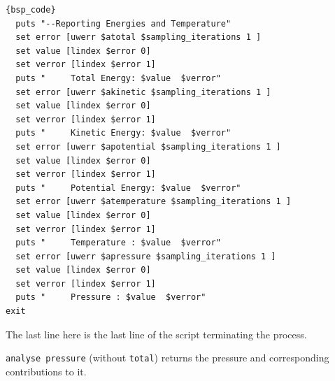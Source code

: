 \documentclass[
paper=a4,                       %
fontsize=11pt,                  %
twoside,                        %
footsepline,                    %
headsepline,                    %
headinclude=false,              %
footinclude=false,              %
pagesize,                       %
]{scrartcl}
\newtheorem{task}{Task}
\begin{document}
{\small\vspace{0,2cm}
\begin{lstlisting}[firstnumber=auto]{bsp_code}
  puts "--Reporting Energies and Temperature"
  set error [uwerr $atotal $sampling_iterations 1 ]
  set value [lindex $error 0]
  set verror [lindex $error 1]
  puts "     Total Energy: $value  $verror"
  set error [uwerr $akinetic $sampling_iterations 1 ]
  set value [lindex $error 0]
  set verror [lindex $error 1]
  puts "     Kinetic Energy: $value  $verror"
  set error [uwerr $apotential $sampling_iterations 1 ]
  set value [lindex $error 0]
  set verror [lindex $error 1]
  puts "     Potential Energy: $value  $verror"
  set error [uwerr $atemperature $sampling_iterations 1 ]
  set value [lindex $error 0]
  set verror [lindex $error 1]
  puts "     Temperature : $value  $verror"
  set error [uwerr $apressure $sampling_iterations 1 ]
  set value [lindex $error 0]
  set verror [lindex $error 1]
  puts "     Pressure : $value  $verror"
exit
\end{lstlisting}}%
\noindent The last line here is the last line of the script terminating the process.

      



\vspace{1cm}\vspace{1cm}

 \texttt{analyse pressure} (without \texttt{total}) returns the pressure and
corresponding contributions to it.
\newpage
\end{document}
